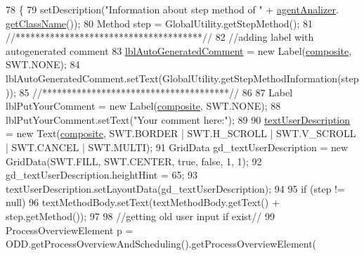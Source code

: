 \begin{DoxyCode}
78                                   \{
79         setDescription(\textcolor{stringliteral}{"Information about step method of "} + \hyperlink{classit_1_1isislab_1_1masonhelperdocumentation_1_1mason_1_1wizards_1_1_l___step_method_page_a0e0b633d8d346100b6ab65b05d9d60e6}{agentAnalizer}.
      \hyperlink{classit_1_1isislab_1_1masonhelperdocumentation_1_1analizer_1_1_agent_analizer_ace466e16439878a851eb63d5a11ddf43}{getClassName}());
80         Method step = GlobalUtility.getStepMethod();
81         \textcolor{comment}{//**************************************//}
82         \textcolor{comment}{//adding label with autogenerated comment}
83         \hyperlink{classit_1_1isislab_1_1masonhelperdocumentation_1_1mason_1_1wizards_1_1_l___step_method_page_af9b2ba2f488b5e92c1e8745127d3162c}{lblAutoGeneratedComment} = \textcolor{keyword}{new} Label(\hyperlink{classit_1_1isislab_1_1masonhelperdocumentation_1_1mason_1_1wizards_1_1_l___step_method_page_a73ff4ee05e8c5b36aed06fa604e32ac2}{composite}, SWT.NONE);
84         lblAutoGeneratedComment.setText(GlobalUtility.getStepMethodInformation(step));
85         \textcolor{comment}{//**************************************//}
86         
87         Label lblPutYourComment = \textcolor{keyword}{new} Label(\hyperlink{classit_1_1isislab_1_1masonhelperdocumentation_1_1mason_1_1wizards_1_1_l___step_method_page_a73ff4ee05e8c5b36aed06fa604e32ac2}{composite}, SWT.NONE);
88         lblPutYourComment.setText(\textcolor{stringliteral}{"Your comment here:"});
89         
90         \hyperlink{classit_1_1isislab_1_1masonhelperdocumentation_1_1mason_1_1wizards_1_1_l___step_method_page_a7cb65b64022898b986f913f4a7ae43d3}{textUserDescription} = \textcolor{keyword}{new} Text(\hyperlink{classit_1_1isislab_1_1masonhelperdocumentation_1_1mason_1_1wizards_1_1_l___step_method_page_a73ff4ee05e8c5b36aed06fa604e32ac2}{composite}, SWT.BORDER | SWT.H\_SCROLL | 
      SWT.V\_SCROLL | SWT.CANCEL | SWT.MULTI);
91         GridData gd\_textUserDescription = \textcolor{keyword}{new} GridData(SWT.FILL, SWT.CENTER, \textcolor{keyword}{true}, \textcolor{keyword}{false}, 1, 1);
92         gd\_textUserDescription.heightHint = 65;
93         textUserDescription.setLayoutData(gd\_textUserDescription);
94         
95         \textcolor{keywordflow}{if} (step != null)
96             textMethodBody.setText(textMethodBody.getText() +  step.getMethod());       
97 
98         \textcolor{comment}{//getting old user input if exist//}
99         ProcessOverviewElement p = ODD.getProcessOverviewAndScheduling().getProcessOverviewElement(

\end{DoxyCode}
